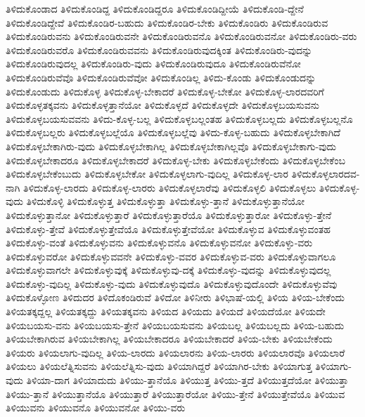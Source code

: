 {ತಿಳಿದುಕೊಂಡಾದ
ತಿಳಿದುಕೊಂಡಿದ್ದ
ತಿಳಿದುಕೊಂಡಿದ್ದರೂ
ತಿಳಿದುಕೊಂಡಿದ್ದೀಯೆ
ತಿಳಿದುಕೊಂಡಿ-ದ್ದೇನೆ
ತಿಳಿದುಕೊಂಡಿದ್ದೇವೆ
ತಿಳಿದುಕೊಂಡಿರ-ಬಹುದು
ತಿಳಿದುಕೊಂಡಿರ-ಬೇಕು
ತಿಳಿದುಕೊಂಡಿರು
ತಿಳಿದುಕೊಂಡಿರುವ
ತಿಳಿದುಕೊಂಡಿರುವನು
ತಿಳಿದುಕೊಂಡಿರುವನೇ
ತಿಳಿದುಕೊಂಡಿರುವನೊ
ತಿಳಿದುಕೊಂಡಿರುವನೋ
ತಿಳಿದುಕೊಂಡಿರು-ವರು
ತಿಳಿದುಕೊಂಡಿರುವರೊ
ತಿಳಿದುಕೊಂಡಿರುವವನು
ತಿಳಿದುಕೊಂಡಿರುವುದಕ್ಕಿಂತ
ತಿಳಿದುಕೊಂಡಿರು-ವುದನ್ನು
ತಿಳಿದುಕೊಂಡಿರುವುದಲ್ಲ
ತಿಳಿದುಕೊಂಡಿರು-ವುದು
ತಿಳಿದುಕೊಂಡಿರುವುದೂ
ತಿಳಿದುಕೊಂಡಿರುವೆನೋ
ತಿಳಿದುಕೊಂಡಿರುವೆವೊ
ತಿಳಿದುಕೊಂಡಿರುವೆವೋ
ತಿಳಿದುಕೊಂಡಿಲ್ಲ
ತಿಳಿದು-ಕೊಂಡು
ತಿಳಿದುಕೊಂಡುದನ್ನು
ತಿಳಿದುಕೊಂಡುದು
ತಿಳಿದುಕೊಳ್ಳ
ತಿಳಿದುಕೊಳ್ಳ-ಬೇಕಾದರೆ
ತಿಳಿದುಕೊಳ್ಳ-ಬೇಕೋ
ತಿಳಿದುಕೊಳ್ಳ-ಲಾರದವರಿಗೆ
ತಿಳಿದುಕೊಳ್ಳತಕ್ಕವನು
ತಿಳಿದುಕೊಳ್ಳತ್ತಾನೆಯೋ
ತಿಳಿದುಕೊಳ್ಳದೆ
ತಿಳಿದುಕೊಳ್ಳದೇ
ತಿಳಿದುಕೊಳ್ಳಬಯಸುವನು
ತಿಳಿದುಕೊಳ್ಳಬಯಸುವವನು
ತಿಳಿದು-ಕೊಳ್ಳ-ಬಲ್ಲ
ತಿಳಿದುಕೊಳ್ಳಬಲ್ಲಂತಹ
ತಿಳಿದುಕೊಳ್ಳಬಲ್ಲದು
ತಿಳಿದುಕೊಳ್ಳಬಲ್ಲನೊ
ತಿಳಿದುಕೊಳ್ಳಬಲ್ಲರು
ತಿಳಿದುಕೊಳ್ಳಬಲ್ಲೆಯೊ
ತಿಳಿದುಕೊಳ್ಳಬಲ್ಲೆವು
ತಿಳಿದು-ಕೊಳ್ಳ-ಬಹುದು
ತಿಳಿದುಕೊಳ್ಳಬೇಕಾಗಿದೆ
ತಿಳಿದುಕೊಳ್ಳಬೇಕಾಗಿರು-ವುದು
ತಿಳಿದುಕೊಳ್ಳಬೇಕಾಗಿಲ್ಲ
ತಿಳಿದುಕೊಳ್ಳಬೇಕಾಗಿಲ್ಲವೊ
ತಿಳಿದುಕೊಳ್ಳಬೇಕಾಗು-ವುದು
ತಿಳಿದುಕೊಳ್ಳಬೇಕಾದರೂ
ತಿಳಿದುಕೊಳ್ಳಬೇಕಾದರೆ
ತಿಳಿದುಕೊಳ್ಳ-ಬೇಕು
ತಿಳಿದುಕೊಳ್ಳಬೇಕೆಂದು
ತಿಳಿದುಕೊಳ್ಳಬೇಕೆಂಬ
ತಿಳಿದುಕೊಳ್ಳಬೇಕೆಂಬುದು
ತಿಳಿದುಕೊಳ್ಳಬೇಕೋ
ತಿಳಿದುಕೊಳ್ಳಲಾಗು-ವುದಿಲ್ಲ
ತಿಳಿದುಕೊಳ್ಳ-ಲಾರ
ತಿಳಿದುಕೊಳ್ಳಲಾರದವ-ನಾಗಿ
ತಿಳಿದುಕೊಳ್ಳ-ಲಾರದು
ತಿಳಿದುಕೊಳ್ಳ-ಲಾರರು
ತಿಳಿದುಕೊಳ್ಳಲಾರೆವು
ತಿಳಿದುಕೊಳ್ಳಲಿ
ತಿಳಿದುಕೊಳ್ಳಲು
ತಿಳಿದುಕೊಳ್ಳ-ವುದು
ತಿಳಿದುಕೊಳ್ಳಿ
ತಿಳಿದುಕೊಳ್ಳುತ್ತ
ತಿಳಿದುಕೊಳ್ಳುತ್ತಾ
ತಿಳಿದುಕೊಳ್ಳು-ತ್ತಾನೆ
ತಿಳಿದುಕೊಳ್ಳುತ್ತಾನೆಯೋ
ತಿಳಿದುಕೊಳ್ಳುತ್ತಾನೋ
ತಿಳಿದುಕೊಳ್ಳುತ್ತಾರೆ
ತಿಳಿದುಕೊಳ್ಳುತ್ತಾರೆಯೊ
ತಿಳಿದುಕೊಳ್ಳುತ್ತಾರೋ
ತಿಳಿದುಕೊಳ್ಳು-ತ್ತೇನೆ
ತಿಳಿದುಕೊಳ್ಳು-ತ್ತೇವೆ
ತಿಳಿದುಕೊಳ್ಳುತ್ತೇವೆಯೊ
ತಿಳಿದುಕೊಳ್ಳುತ್ತೇವೆಯೋ
ತಿಳಿದುಕೊಳ್ಳುವ
ತಿಳಿದುಕೊಳ್ಳುವಂತಹ
ತಿಳಿದುಕೊಳ್ಳು-ವಂತೆ
ತಿಳಿದುಕೊಳ್ಳುವನು
ತಿಳಿದುಕೊಳ್ಳುವನೊ
ತಿಳಿದುಕೊಳ್ಳುವನೋ
ತಿಳಿದುಕೊಳ್ಳು-ವರು
ತಿಳಿದುಕೊಳ್ಳುವರೋ
ತಿಳಿದುಕೊಳ್ಳುವವನೇ
ತಿಳಿದುಕೊಳ್ಳು-ವವರ
ತಿಳಿದುಕೊಳ್ಳುವ-ವರು
ತಿಳಿದುಕೊಳ್ಳುವಾಗಲೂ
ತಿಳಿದುಕೊಳ್ಳುವಾಗಲೇ
ತಿಳಿದುಕೊಳ್ಳುವುಕ್ಕೆ
ತಿಳಿದುಕೊಳ್ಳುವು-ದಕ್ಕೆ
ತಿಳಿದುಕೊಳ್ಳು-ವುದನ್ನು
ತಿಳಿದುಕೊಳ್ಳುವುದಲ್ಲ
ತಿಳಿದುಕೊಳ್ಳು-ವುದಿಲ್ಲ
ತಿಳಿದುಕೊಳ್ಳು-ವುದು
ತಿಳಿದುಕೊಳ್ಳುವುದೊ
ತಿಳಿದುಕೊಳ್ಳುವುದೊಂದೇ
ತಿಳಿದುಕೊಳ್ಳುವೆವು
ತಿಳಿದುಕೊಳ್ಳೋಣ
ತಿಳಿದುದರ
ತಿಳಿದೊಕಂಡಿರುವೆ
ತಿಳಿದೋ
ತಿಳಿನೀರು
ತಿಳಿಭಾಷೆ-ಯಲ್ಲಿ
ತಿಳಿಯ
ತಿಳಿಯ-ಬೇಕೆಂದು
ತಿಳಿಯತಕ್ಕದ್ದಲ್ಲ
ತಿಳಿಯತಕ್ಕದ್ದು
ತಿಳಿಯತಕ್ಕವನು
ತಿಳಿಯದ
ತಿಳಿಯದು
ತಿಳಿಯದೆ
ತಿಳಿಯದೆಯೋ
ತಿಳಿಯದೇ
ತಿಳಿಯಬಯಸು-ವನು
ತಿಳಿಯಬಯಸು-ತ್ತೇನೆ
ತಿಳಿಯಬಯಸುವನು
ತಿಳಿಯಬಲ್ಲ
ತಿಳಿಯಬಲ್ಲದು
ತಿಳಿಯ-ಬಹುದು
ತಿಳಿಯಬೇಕಾಗಿರುವ
ತಿಳಿಯಬೇಕಾಗಿಲ್ಲ
ತಿಳಿಯಬೇಕಾದರೂ
ತಿಳಿಯಬೇಕಾದರೆ
ತಿಳಿಯ-ಬೇಕು
ತಿಳಿಯಬೇಕೆಂದು
ತಿಳಿಯರು
ತಿಳಿಯಲಾಗು-ವುದಿಲ್ಲ
ತಿಳಿಯ-ಲಾರದು
ತಿಳಿಯಲಾರನು
ತಿಳಿಯ-ಲಾರರು
ತಿಳಿಯಲಾರವೊ
ತಿಳಿಯಲಾರೆ
ತಿಳಿಯಲು
ತಿಳಿಯಲೆತ್ನಿಸುವನು
ತಿಳಿಯಲೆತ್ನಿಸು-ವುದು
ತಿಳಿಯಾಗಿದ್ದರೆ
ತಿಳಿಯಾಗಿರ-ಬೇಕು
ತಿಳಿಯಾಗುತ್ತ
ತಿಳಿಯಾಗು-ವುದು
ತಿಳಿಯಾ-ದಾಗ
ತಿಳಿಯಾದುದು
ತಿಳಿಯು-ತ್ತಾನೆಯೊ
ತಿಳಿಯುತ್ತ
ತಿಳಿಯು-ತ್ತದೆ
ತಿಳಿಯುತ್ತದೆಯೋ
ತಿಳಿಯುತ್ತಾ
ತಿಳಿಯು-ತ್ತಾನೆ
ತಿಳಿಯುತ್ತಾನೆಯೊ
ತಿಳಿಯುತ್ತಾರೆ
ತಿಳಿಯುತ್ತಾರೆಯೋ
ತಿಳಿಯು-ತ್ತೇನೆ
ತಿಳಿಯುತ್ತೇವೆಯೊ
ತಿಳಿಯುವ
ತಿಳಿಯುವನು
ತಿಳಿಯುವನೊ
ತಿಳಿಯುವನೋ
ತಿಳಿಯು-ವರು
}
